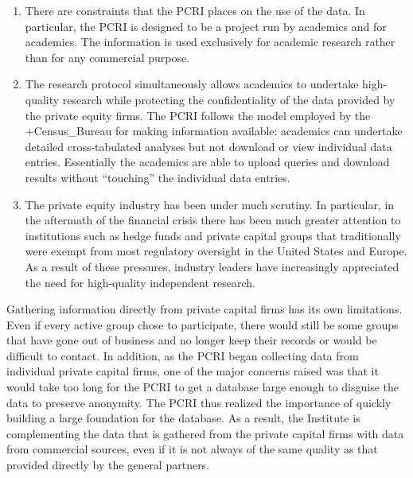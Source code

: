 \documentclass[
]{WileySix}
\begin{document}
\begin{enumerate}
\def\labelenumi{\arabic{enumi})}
\item
  There are constraints that the PCRI places on the use of the data. In particular, the PCRI is designed to be a project run by academics and for academics. The information is used exclusively for academic research rather than for any commercial purpose.
\item
  The research protocol simultaneously allows academics to undertake high-quality research while protecting the confidentiality of the data provided by the private equity firms. The PCRI follows the model employed by the +Census\_Bureau\textbar{} for making information available: academics can undertake detailed cross-tabulated analyses but not download or view individual data entries. Essentially the academics are able to upload queries and download results without ``touching'' the individual data entries.
\item
  The private equity industry has been under much scrutiny. In particular, in the aftermath of the financial crisis there has been much greater attention to institutions such as hedge funds and private capital groups that traditionally were exempt from most regulatory oversight in the United States and Europe. As a result of these pressures, industry leaders have increasingly appreciated the need for high-quality independent research.
\end{enumerate}

Gathering information directly from private capital firms has its own limitations. Even if every active group chose to participate, there would still be some groups that have gone out of business and no longer keep their records or would be difficult to contact. In addition, as the PCRI began collecting data from individual private capital firms, one of the major concerns raised was that it would take too long for the PCRI to get a database large enough to disguise the data to preserve anonymity. The PCRI thus realized the importance of quickly building a large foundation for the database. As a result, the Institute is complementing the data that is gathered from the private capital firms with data from commercial sources, even if it is not always of the same quality as that provided directly by the general partners.
\end{document}
